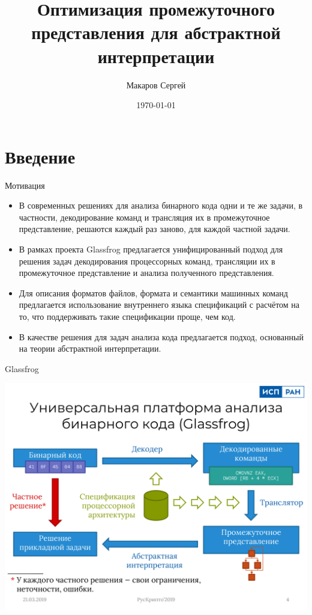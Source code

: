 \documentclass[presentation]{beamer}
\author{Макаров Сергей}
\date{\today}
\title{Оптимизация промежуточного представления для абстрактной интерпретации}
\begin{document}
\maketitle

\section{Введение}
\label{sec:orgde2a474}
\begin{frame}[label={sec:org71fac9c}]{Мотивация}
\begin{itemize}
\item В современных решениях для анализа бинарного кода одни и те же задачи, в частности, декодирование команд и трансляция их в промежуточное представление, решаются каждый раз заново, для каждой частной задачи.
\item В рамках проекта Glassfrog предлагается унифицированный подход для решения задач декодирования процессорных команд, трансляции их в промежуточное представление и анализа полученного представления.
\item Для описания форматов файлов, формата и семантики машинных команд предлагается использование внутреннего языка спецификаций с расчётом на то, что поддерживать такие спецификации проще, чем код.
\item В качестве решения для задач анализа кода предлагается подход, основанный на теории абстрактной интерпретации.
\end{itemize}
\end{frame}
\begin{frame}[label={sec:org257d466}]{Glassfrog}
\begin{center}
\includegraphics[width=.9\linewidth]{./glassfrog.png}
\end{center}
\end{frame}
\end{document}
